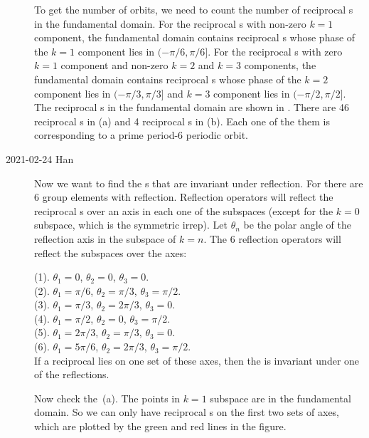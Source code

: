 \begin{description}
To get the number of orbits, we need to count the number of reciprocal {\lattstate}s in the
fundamental domain. For the reciprocal {\lattstate}s with non-zero $k=1$ component, the
fundamental domain contains reciprocal {\lattstate}s whose phase of the $k=1$ component
lies in $(-\pi/6,\pi/6]$.
For the reciprocal {\lattstate}s with zero $k=1$ component and non-zero $k=2$ and
$k=3$ components, the
fundamental domain contains reciprocal {\lattstate}s whose phase of the $k=2$ component
lies in $(-\pi/3,\pi/3]$ and $k=3$ component lies in $(-\pi/2,\pi/2]$. The reciprocal {\lattstate}s
in the fundamental domain are shown in . There are
46 reciprocal {\lattstate}s in  (a) and 4 reciprocal
{\lattstate}s in (b). Each one of the them is corresponding to a prime period-6 periodic
orbit.

    \item[2021-02-24 Han]
Now we want to find the {\lattstate}s that are invariant under
reflection. For  there are 6 group elements with
reflection. Reflection operators will reflect the reciprocal
{\lattstate}s over an axis in each one of the subspaces (except for the
$k=0$ subspace, which is the symmetric irrep). Let
$\theta_n$ be the polar angle of the reflection axis in the subspace of
$k=n$. The 6 reflection operators will reflect the subspaces over the
axes:

(1). $\theta_1=0$, $\theta_2=0$, $\theta_3=0$. \\
(2). $\theta_1=\pi/6$, $\theta_2=\pi/3$, $\theta_3=\pi/2$. \\
(3). $\theta_1=\pi/3$, $\theta_2=2\pi/3$, $\theta_3=0$. \\
(4). $\theta_1=\pi/2$, $\theta_2=0$, $\theta_3=\pi/2$. \\
(5). $\theta_1=2\pi/3$, $\theta_2=\pi/3$, $\theta_3=0$. \\
(6). $\theta_1=5\pi/6$, $\theta_2=2\pi/3$, $\theta_3=\pi/2$. \\

If a reciprocal {\lattstate} lies on one set of these axes, then the {\lattstate} is invariant under
one of the reflections.

Now check the \,(a). The points in $k=1$ subspace are in the
fundamental domain. So we can only have reciprocal {\lattstate}s on the first two sets of axes,
which are plotted by the green and red lines in the figure.


\end{description}
